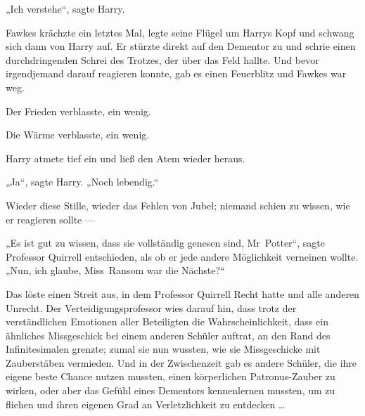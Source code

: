 „Ich verstehe“, sagte Harry.

Fawkes krächzte ein letztes Mal, legte seine Flügel um Harrys Kopf und schwang sich dann von Harry auf. Er stürzte direkt auf den Dementor zu und schrie einen durchdringenden Schrei des Trotzes, der über das Feld hallte. Und bevor irgendjemand darauf reagieren konnte, gab es einen Feuerblitz und Fawkes war weg.

Der Frieden verblasste, ein wenig.

Die Wärme verblasste, ein wenig.

Harry atmete tief ein und ließ den Atem wieder heraus.

„Ja“, sagte Harry.
„Noch lebendig.“

Wieder diese Stille, wieder das Fehlen von Jubel; niemand schien zu wissen, wie er reagieren sollte —

„Es ist gut zu wissen, dass sie vollständig genesen sind, Mr~Potter“, sagte Professor Quirrell entschieden, als ob er jede andere Möglichkeit verneinen wollte.
„Nun, ich glaube, Miss~Ransom war die Nächste?“

Das löste einen Streit aus, in dem Professor Quirrell Recht hatte und alle anderen Unrecht. Der Verteidigungsprofessor wies darauf hin, dass trotz der verständlichen Emotionen aller Beteiligten die Wahrscheinlichkeit, dass ein ähnliches Missgeschick bei einem anderen Schüler auftrat, an den Rand des Infinitesimalen grenzte; zumal sie nun wussten, wie sie Missgeschicke mit Zauberstäben vermieden. Und in der Zwischenzeit gab es andere Schüler, die ihre eigene beste Chance nutzen mussten, einen körperlichen Patronus-Zauber zu wirken, oder aber das Gefühl eines Dementors kennenlernen mussten, um zu fliehen und ihren eigenen Grad an Verletzlichkeit zu entdecken …


